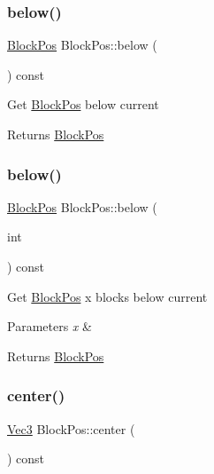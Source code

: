 \subsubsection{\texorpdfstring{below()}{below()}\hspace{0.1cm}{\footnotesize\ttfamily [1/2]}}
{\footnotesize\ttfamily \mbox{\hyperlink{struct_block_pos}{Block\+Pos}} Block\+Pos\+::below (\begin{DoxyParamCaption}{ }\end{DoxyParamCaption}) const}

Get \mbox{\hyperlink{struct_block_pos}{Block\+Pos}} below current \begin{DoxyReturn}{Returns}
\mbox{\hyperlink{struct_block_pos}{Block\+Pos}} 
\end{DoxyReturn}
\mbox{\label{struct_block_pos_a5776b70a3ea3ffe78ae37633d97ea602}} 
\subsubsection{\texorpdfstring{below()}{below()}\hspace{0.1cm}{\footnotesize\ttfamily [2/2]}}
{\footnotesize\ttfamily \mbox{\hyperlink{struct_block_pos}{Block\+Pos}} Block\+Pos\+::below (\begin{DoxyParamCaption}\item[{int}]{ }\end{DoxyParamCaption}) const}

Get \mbox{\hyperlink{struct_block_pos}{Block\+Pos}} x blocks below current 
\begin{DoxyParams}{Parameters}
{\em x} & \\
\hline
\end{DoxyParams}
\begin{DoxyReturn}{Returns}
\mbox{\hyperlink{struct_block_pos}{Block\+Pos}} 
\end{DoxyReturn}
\mbox{\label{struct_block_pos_ab3098efb3353c424a71040cbd4f3f91e}} 
\subsubsection{\texorpdfstring{center()}{center()}}
{\footnotesize\ttfamily \mbox{\hyperlink{struct_vec3}{Vec3}} Block\+Pos\+::center (\begin{DoxyParamCaption}{ }\end{DoxyParamCaption}) const}

